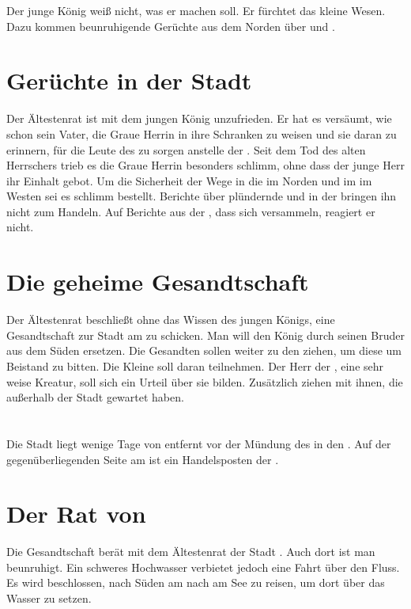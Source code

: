 \begin{huge}
Der junge König weiß nicht, was er machen soll. Er fürchtet das kleine Wesen. Dazu kommen beunruhigende Gerüchte aus dem Norden über \Eisbestien und \Eislaufer. 

\section{Gerüchte in der Stadt}
Der Ältestenrat ist mit dem jungen König unzufrieden. Er hat es versäumt, wie schon sein Vater, die Graue Herrin in ihre Schranken zu weisen und sie daran zu erinnern, für die Leute des  zu sorgen anstelle der \Bangiri. Seit dem Tod des alten Herrschers trieb es die Graue Herrin besonders schlimm, ohne dass der junge Herr ihr Einhalt gebot. Um die Sicherheit der Wege in die \Bergmark im Norden und im \Rhinland im Westen sei es schlimm bestellt. Berichte über plündernde \Bangiri und \Eislaufer in der \Nordmark bringen ihn nicht zum Handeln. Auf Berichte aus der \Bergmark, dass sich \Eisbestien versammeln, reagiert er nicht.

\section{Die geheime Gesandtschaft}
Der Ältestenrat beschließt ohne das Wissen des jungen Königs, eine Gesandtschaft zur Stadt \Toris am \Dreifluss zu schicken. Man will den König durch seinen Bruder aus dem Süden ersetzen. Die Gesandten sollen weiter zu den  ziehen, um diese um Beistand zu bitten. Die Kleine soll daran teilnehmen. Der Herr der \Eisenmeister, eine sehr weise Kreatur, soll sich ein Urteil über sie bilden. Zusätzlich ziehen \Schattenjager mit ihnen, die außerhalb der Stadt gewartet haben.

\section{\Toris}
Die Stadt \Toris liegt wenige Tage von \Rhin entfernt vor der Mündung des \Rhingell in den \Dreifluss. Auf der gegenüberliegenden Seite am \Dreifluss ist ein Handelsposten der \Eisenmeister.

\section{Der Rat von \Toris}
Die Gesandtschaft berät mit dem Ältestenrat der Stadt \Toris. Auch dort ist man beunruhigt. Ein schweres Hochwasser verbietet jedoch eine Fahrt über den Fluss. Es wird beschlossen, nach Süden am \Dreifluss nach \Braucheln am See zu reisen, um dort über das Wasser zu setzen.


\end{huge}
